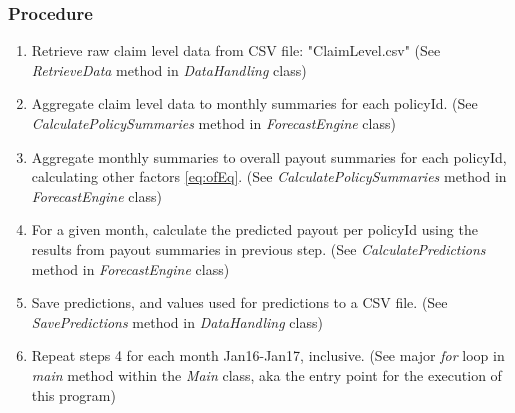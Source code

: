 \documentclass[12pt,letterpaper,titlepage]{article}
\begin{document}
			\subsubsection{Procedure} \label{sec:procedure}
				\begin{enumerate}
					\item Retrieve raw claim level data from CSV file: "ClaimLevel.csv" (See \emph{RetrieveData} method in \emph{DataHandling} class)
					
					\item Aggregate claim level data to monthly summaries for each policyId. (See \emph{CalculatePolicySummaries} method in \emph{ForecastEngine} class)
					
					\item Aggregate monthly summaries to overall payout summaries for each policyId, calculating other factors \ref{eq:ofEq}. (See \emph{CalculatePolicySummaries} method in \emph{ForecastEngine} class)
					
					\item For a given month, calculate the predicted payout per policyId using the results from payout summaries in previous step.  (See \emph{CalculatePredictions} method in \emph{ForecastEngine} class)
					
					\item Save predictions, and values used for predictions to a CSV file. (See \emph{SavePredictions} method in \emph{DataHandling} class)
					
					\item Repeat steps 4 for each month Jan16-Jan17, inclusive.  (See major \emph{for} loop in \emph{main} method within the \emph{Main} class, aka the entry point for the execution of this program)
				\end{enumerate}
				
\end{document}
